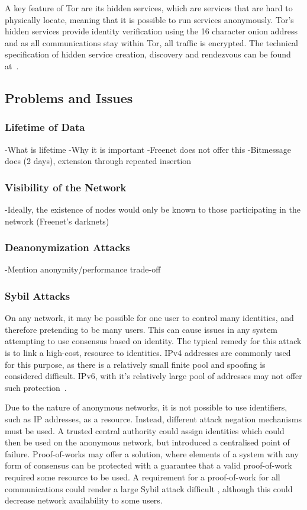 			A key feature of Tor are its hidden services, which are services that are hard to physically locate, meaning that it is possible to run services anonymously. Tor's hidden services provide identity verification using the 16 character onion address and as all communications stay within Tor, all traffic is encrypted. The technical specification of hidden service creation, discovery and rendezvous can be found at~\cite{tor_rend}.
	\subsection{Problems and Issues}
		\subsubsection*{Lifetime of Data}
			-What is lifetime
			-Why it is important
			-Freenet does not offer this
			-Bitmessage does (2 days), extension through repeated insertion
		\subsubsection*{Visibility of the Network}
			-Ideally, the existence of nodes would only be known to those participating in the network (Freenet's darknets)
		\subsubsection*{Deanonymization Attacks}
			-Mention anonymity/performance trade-off
		\subsubsection*{Sybil Attacks} \label{sybil_problems}
			On any network, it may be possible for one user to control many identities, and therefore pretending to be many users. This can cause issues in any system attempting to use consensus based on identity. The typical remedy for this attack is to link a high-cost, resource to identities. IPv4 addresses are commonly used for this purpose, as there is a relatively small finite pool and spoofing is considered difficult. IPv6, with it's relatively large pool of addresses may not offer such protection~\cite{cholez2009evaluation}.
		
			Due to the nature of anonymous networks, it is not possible to use identifiers, such as IP addresses, as a resource. Instead, different attack negation mechanisms must be used. A trusted central authority could assign identities which could then be used on the anonymous network, but introduced a centralised point of failure. Proof-of-works may offer a solution, where elements of a system with any form of consensus can be protected with a guarantee that a valid proof-of-work required some resource to be used. A requirement for a proof-of-work for all communications could render a large Sybil attack difficult \cite{borisov2006computational}, although this could decrease network availability to some users.
		

